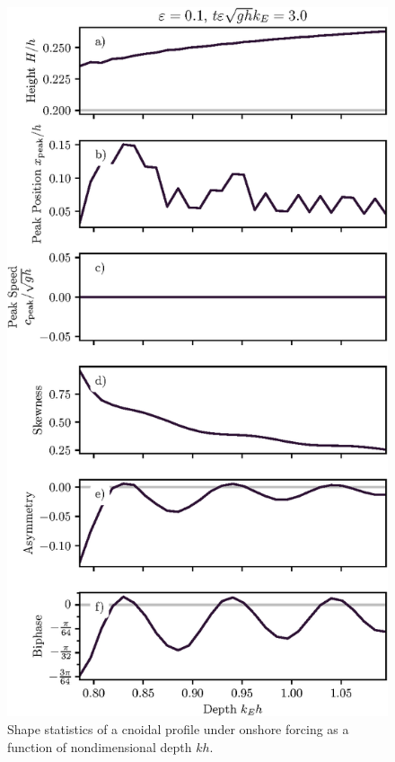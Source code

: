 \documentclass{jfm}
\begin{document}
\begin{figure}
  \centering
  \includegraphics{Skew-Asymm-Cnoidal-kh.eps}
  \caption{
    Shape statistics of a cnoidal profile under onshore forcing as a
    function of nondimensional depth $kh$.
  }
\end{figure}
\end{document}
